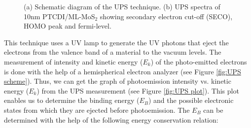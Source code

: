 \documentclass[12pt]{article}
\begin{document}
\begin{figure}[H]
\centering
{}
\caption{(a) Schematic diagram of the UPS technique. (b) UPS spectra of 10nm PTCDI/ML-MoS$_2$ showing secondary electron cut-off (SECO), HOMO peak and fermi-level.}
\label{fig:UPS method}
\end{figure}


This technique uses a UV lamp to generate the UV photons that eject the electrons from the valence band of a material to the vacuum levels. The measurement of intensity and kinetic energy ($E_k$) of the photo-emitted electrons is done with the help of a hemispherical electron analyzer (see Figure \ref{fig:UPS scheme}). Thus, we can get the graph of photoemission intensity vs. kinetic energy ($E_k$) from the UPS measurement (see Figure \ref{fig:UPS plot}). This plot enables us to determine the binding energy ($E_B$) and the possible electronic states from which they are ejected before photoemission. The $E_B$ can be determined with the help of the following energy conservation relation:
\end{document}

